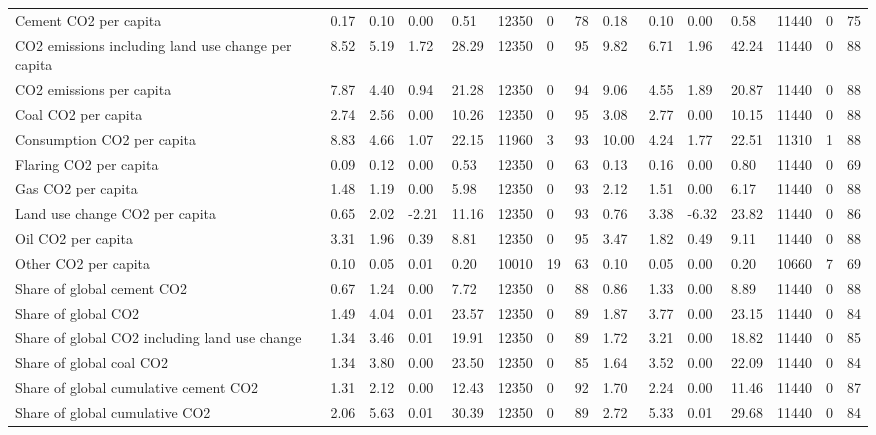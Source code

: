 \begin{longtable}{lllllllllllllll}
\addlinespace
Cement CO2 per capita & 0.17 & 0.10 & 0.00 & 0.51 & 12350 & 0 & 78 & 0.18 & 0.10 & 0.00 & 0.58 & 11440 & 0 & 75\\
CO2 emissions including land use change per capita & 8.52 & 5.19 & 1.72 & 28.29 & 12350 & 0 & 95 & 9.82 & 6.71 & 1.96 & 42.24 & 11440 & 0 & 88\\
CO2 emissions per capita & 7.87 & 4.40 & 0.94 & 21.28 & 12350 & 0 & 94 & 9.06 & 4.55 & 1.89 & 20.87 & 11440 & 0 & 88\\
Coal CO2 per capita & 2.74 & 2.56 & 0.00 & 10.26 & 12350 & 0 & 95 & 3.08 & 2.77 & 0.00 & 10.15 & 11440 & 0 & 88\\
Consumption CO2 per capita & 8.83 & 4.66 & 1.07 & 22.15 & 11960 & 3 & 93 & 10.00 & 4.24 & 1.77 & 22.51 & 11310 & 1 & 88\\
\addlinespace
Flaring CO2 per capita & 0.09 & 0.12 & 0.00 & 0.53 & 12350 & 0 & 63 & 0.13 & 0.16 & 0.00 & 0.80 & 11440 & 0 & 69\\
Gas CO2 per capita & 1.48 & 1.19 & 0.00 & 5.98 & 12350 & 0 & 93 & 2.12 & 1.51 & 0.00 & 6.17 & 11440 & 0 & 88\\
Land use change CO2 per capita & 0.65 & 2.02 & -2.21 & 11.16 & 12350 & 0 & 93 & 0.76 & 3.38 & -6.32 & 23.82 & 11440 & 0 & 86\\
Oil CO2 per capita & 3.31 & 1.96 & 0.39 & 8.81 & 12350 & 0 & 95 & 3.47 & 1.82 & 0.49 & 9.11 & 11440 & 0 & 88\\
Other CO2 per capita & 0.10 & 0.05 & 0.01 & 0.20 & 10010 & 19 & 63 & 0.10 & 0.05 & 0.00 & 0.20 & 10660 & 7 & 69\\
\addlinespace
Share of global cement CO2 & 0.67 & 1.24 & 0.00 & 7.72 & 12350 & 0 & 88 & 0.86 & 1.33 & 0.00 & 8.89 & 11440 & 0 & 88\\
Share of global CO2 & 1.49 & 4.04 & 0.01 & 23.57 & 12350 & 0 & 89 & 1.87 & 3.77 & 0.00 & 23.15 & 11440 & 0 & 84\\
Share of global CO2 including land use change & 1.34 & 3.46 & 0.01 & 19.91 & 12350 & 0 & 89 & 1.72 & 3.21 & 0.00 & 18.82 & 11440 & 0 & 85\\
Share of global coal CO2 & 1.34 & 3.80 & 0.00 & 23.50 & 12350 & 0 & 85 & 1.64 & 3.52 & 0.00 & 22.09 & 11440 & 0 & 84\\
Share of global cumulative cement CO2 & 1.31 & 2.12 & 0.00 & 12.43 & 12350 & 0 & 92 & 1.70 & 2.24 & 0.00 & 11.46 & 11440 & 0 & 87\\
\addlinespace
Share of global cumulative CO2 & 2.06 & 5.63 & 0.01 & 30.39 & 12350 & 0 & 89 & 2.72 & 5.33 & 0.01 & 29.68 & 11440 & 0 & 84\\

\end{longtable}
